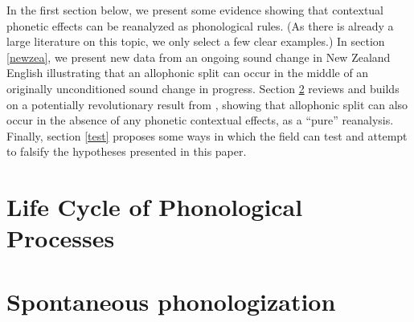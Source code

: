 In the first section below, we present some evidence showing that contextual phonetic effects can be reanalyzed as phonological rules. (As there is already a large literature on this topic, we only select a few clear examples.) In section \ref{newzea}, we present new data from an ongoing sound change in New Zealand English illustrating that an allophonic split can occur in the middle of an originally unconditioned sound change in progress. Section \ref{philly} reviews and builds on a potentially revolutionary result from \citet{fruehwald2013}, showing that allophonic split can also occur in the absence of any phonetic contextual effects, as a ``pure'' reanalysis. Finally, section \ref{test} proposes some ways in which the field can test and attempt to falsify the hypotheses presented in this paper.




\section{Life Cycle of Phonological Processes}
\label{trad}



\section{Spontaneous phonologization}
\label{philly}

